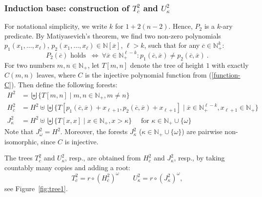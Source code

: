 \documentclass[envcountsame]{llncs}
\newcommand{\N}{\mathbb N}
\begin{document}
\subsubsection{Induction base: construction of $T^2_{\overline{c}}$ and
  $U^2_\kappa$}\label{sss:base}

For notational simplicity, we write $k$ for $1+2(n-2)$. 
Hence, $P_2$ is a $k$-ary predicate. By
Matiyasevich's theorem, we find two non-zero polynomials
$p_1(x_1,\ldots,x_\ell)$, $p_2(x_1,\ldots,x_\ell)\in
\N[\overline{x}]$, $\ell> k$, such that for any $\overline{c} \in
\N_+^k$:
\[
 P_2(\overline{c}) \text{ holds  } \ \iff \ \forall \overline{x} \in \N_+^{\ell-k} :
  p_1(\overline{c},\overline{x})\neq p_2(\overline{c},\overline{x})\ .
\]
For two numbers $m,n\in\N_+$, let $T[m,n]$ denote the tree of height
$1$ with exactly $C(m,n)$ leaves, where $C$ is the injective polynomial function 
from (\ref{function-C}).  Then define the following forests:
\begin{align*}
  H^2 &= \biguplus\{T[m,n]\mid m,n\in\N_+,m\neq n\}\\
  H^2_{\overline c} &=  H^2 \uplus\biguplus
\{T[p_1(\overline c,\overline x)+x_{\ell+1},
    p_2(\overline c,\overline x)+x_{\ell+1}]\mid \overline x\in\N_+^{\ell-k},x_{\ell+1}\in\N_+\}\\
  J^2_\kappa &= H^2 \uplus\biguplus\{T[x,x]\mid x\in\N_+, x > \kappa\}  \quad
  \text{ for }\kappa\in\N_+   \cup \{\omega\}
\end{align*}
Note that $J^2_\omega = H^2$. Moreover, the forests $J^2_\kappa$
($\kappa\in\N_+   \cup \{\omega\}$) are pairwise non-isomorphic, since $C$
is injective.

The trees $T^2_{\overline{c}}$ and $U^2_\kappa$, resp.,
are obtained from $H^2_{\overline c}$ and $J^2_\kappa$, resp., by
taking countably many copies and adding a root:
\begin{equation}\label{def-tree-from-forest-2}
  T^2_{\overline c} = r\circ (H^2_{\overline c})^\omega \qquad
  U^2_\kappa        = r\circ (J^2_\kappa)^\omega,
\end{equation}
see Figure~\ref{fig:tree1}.
\end{document}
